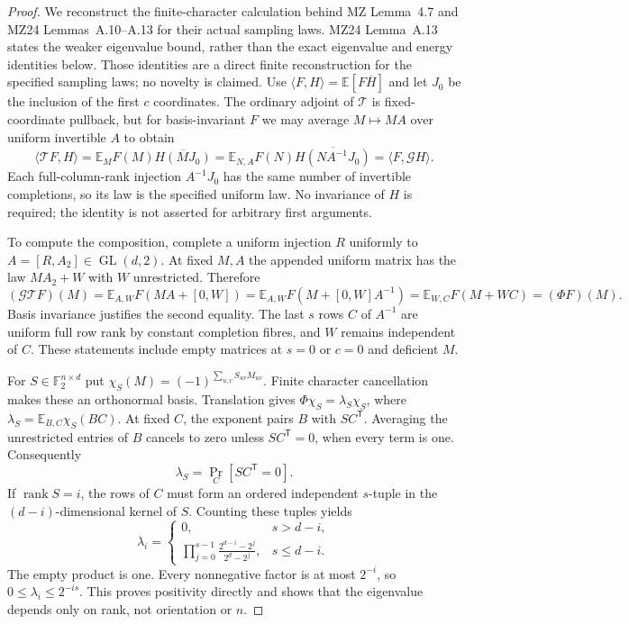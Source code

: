 \begin{proof}
We reconstruct the finite-character calculation behind MZ Lemma~4.7
and MZ24 Lemmas~A.10--A.13 for their actual sampling laws.
MZ24 Lemma~A.13 states the weaker eigenvalue bound, rather than the exact
eigenvalue and energy identities below. Those identities are a direct finite
reconstruction for the specified sampling laws; no novelty is claimed.
Use $\langle F,H\rangle=\mathbb E[F\overline H]$ and let $J_0$ be
the inclusion of the first $c$ coordinates. The ordinary adjoint of
$\mathcal T$ is fixed-coordinate pullback, but for basis-invariant $F$
we may average $M\mapsto MA$ over uniform invertible $A$ to obtain
\[
 \langle\mathcal TF,H\rangle
 =\mathbb E_M F(M)\overline{H(MJ_0)}
 =\mathbb E_{N,A}F(N)\overline{H(NA^{-1}J_0)}
 =\langle F,\mathcal GH\rangle.
\]
Each full-column-rank injection $A^{-1}J_0$ has the same number of
invertible completions, so its law is the specified uniform law.
No invariance of $H$ is required; the identity is not asserted for
arbitrary first arguments.

To compute the composition, complete a uniform injection $R$ uniformly
to $A=[R,A_2]\in\operatorname{GL}(d,2)$. At fixed $M,A$ the appended
uniform matrix has the law $MA_2+W$ with $W$ unrestricted. Therefore
\[
 (\mathcal G\mathcal TF)(M)
 =\mathbb E_{A,W}F(MA+[0,W])
 =\mathbb E_{A,W}F(M+[0,W]A^{-1})
 =\mathbb E_{W,C}F(M+WC)=(\Phi F)(M).
\]
Basis invariance justifies the second equality. The last $s$ rows
$C$ of $A^{-1}$ are uniform full row rank by constant completion
fibres, and $W$ remains independent of $C$. These statements include
empty matrices at $s=0$ or $c=0$ and deficient $M$.

For $S\in\mathbb F_2^{n\times d}$ put
$\chi_S(M)=(-1)^{\sum_{u,v}S_{uv}M_{uv}}$.
Finite character cancellation makes these an orthonormal basis.
Translation gives $\Phi\chi_S=\lambda_S\chi_S$, where
$\lambda_S=\mathbb E_{B,C}\chi_S(BC)$.
At fixed $C$, the exponent pairs $B$ with $SC^{\mathsf T}$.
Averaging the unrestricted entries of $B$ cancels to zero unless
$SC^{\mathsf T}=0$, when every term is one. Consequently
\[
 \lambda_S=\Pr_C[SC^{\mathsf T}=0].
\]
If $\operatorname{rank}S=i$, the rows of $C$ must form an ordered
independent $s$-tuple in the $(d-i)$-dimensional kernel of $S$.
Counting these tuples yields
\[
 \lambda_i=\begin{cases}
 0,&s>d-i,\\
 \displaystyle\prod_{j=0}^{s-1}
       \frac{2^{d-i}-2^j}{2^d-2^j},&s\le d-i.
 \end{cases}
\]
The empty product is one. Every nonnegative factor is at most $2^{-i}$,
so $0\le\lambda_i\le2^{-is}$. This proves positivity directly and
shows that the eigenvalue depends only on rank, not orientation or $n$.


\end{proof}
